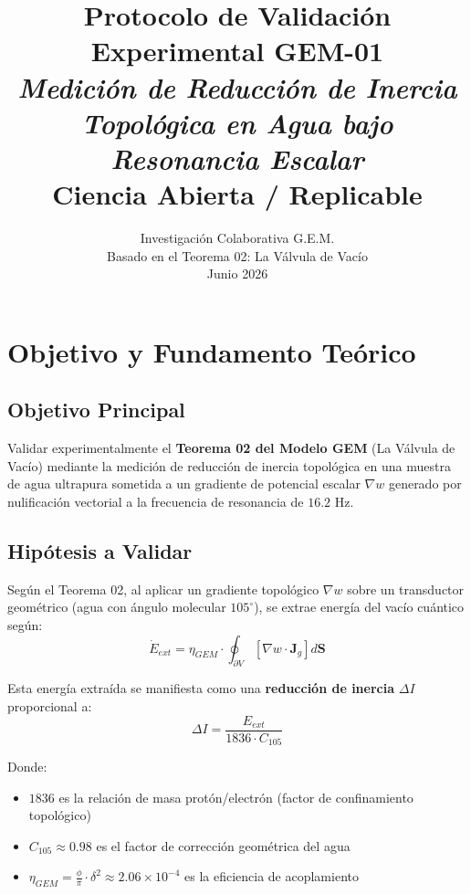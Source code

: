 \documentclass[12pt, a4paper]{article}
\title{\textbf{\Huge \textcolor{cosmicpurple}{Protocolo de Validación Experimental GEM-01}} \\[0.5cm]
\Large \textit{Medición de Reducción de Inercia Topológica en Agua bajo Resonancia Escalar} \\[0.3cm]
\large \textcolor{gemgold}{\textbf{Ciencia Abierta / Replicable}}}
\author{Investigación Colaborativa G.E.M. \\ \small Basado en el Teorema 02: La Válvula de Vacío \\ \small Junio 2026}
\date{}
\begin{document}
\maketitle
\thispagestyle{empty}
\newpage

\tableofcontents
\newpage

\section{Objetivo y Fundamento Teórico}

\subsection{Objetivo Principal}
Validar experimentalmente el \textbf{Teorema 02 del Modelo GEM} (La Válvula de Vacío) mediante la medición de reducción de inercia topológica en una muestra de agua ultrapura sometida a un gradiente de potencial escalar $\nabla w$ generado por nulificación vectorial a la frecuencia de resonancia de $16.2$ Hz.

\subsection{Hipótesis a Validar}
Según el Teorema 02, al aplicar un gradiente topológico $\nabla w$ sobre un transductor geométrico (agua con ángulo molecular $105^\circ$), se extrae energía del vacío cuántico según:
\begin{equation}
\dot{E}_{ext} = \eta_{GEM} \cdot \oint_{\partial V} [\nabla w \cdot \mathbf{J}_g] d\mathbf{S}
\end{equation}

Esta energía extraída se manifiesta como una \textbf{reducción de inercia} $\Delta I$ proporcional a:
\begin{equation}
\Delta I = \frac{E_{ext}}{1836 \cdot C_{105}}
\end{equation}

Donde:
\begin{itemize}
    \item $1836$ es la relación de masa protón/electrón (factor de confinamiento topológico)
    \item $C_{105} \approx 0.98$ es el factor de corrección geométrica del agua
    \item $\eta_{GEM} = \frac{\phi}{\pi} \cdot \delta^2 \approx 2.06 \times 10^{-4}$ es la eficiencia de acoplamiento
\end{itemize}
\end{document}

